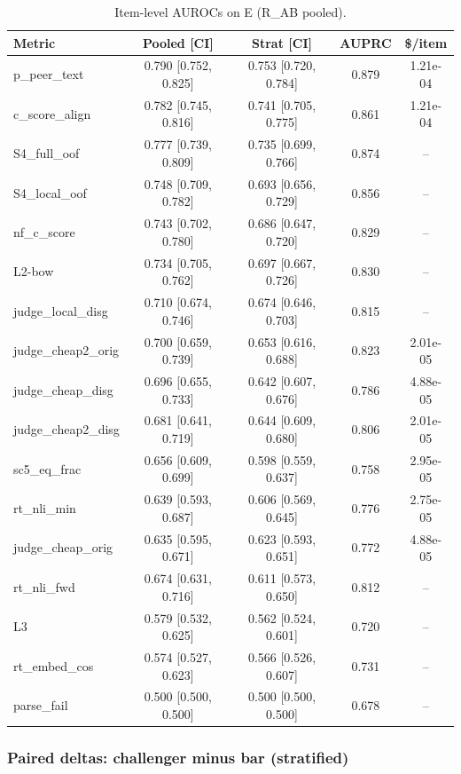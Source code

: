 \documentclass[11pt,letterpaper]{article}
\begin{document}
\begin{table}[!htbp]
\centering
\caption{Item-level AUROCs on E (R\_AB pooled).}
\label{tab:t1_itemlevel}
\small
\begin{tabular}{lcccc}
\toprule
Metric & Pooled [CI] & Strat [CI] & AUPRC & \$/item \\
\midrule
p\_peer\_text & 0.790 [0.752, 0.825] & 0.753 [0.720, 0.784] & 0.879 & 1.21e-04 \\
c\_score\_align & 0.782 [0.745, 0.816] & 0.741 [0.705, 0.775] & 0.861 & 1.21e-04 \\
S4\_full\_oof & 0.777 [0.739, 0.809] & 0.735 [0.699, 0.766] & 0.874 & -- \\
S4\_local\_oof & 0.748 [0.709, 0.782] & 0.693 [0.656, 0.729] & 0.856 & -- \\
nf\_c\_score & 0.743 [0.702, 0.780] & 0.686 [0.647, 0.720] & 0.829 & -- \\
L2-bow & 0.734 [0.705, 0.762] & 0.697 [0.667, 0.726] & 0.830 & -- \\
judge\_local\_disg & 0.710 [0.674, 0.746] & 0.674 [0.646, 0.703] & 0.815 & -- \\
judge\_cheap2\_orig & 0.700 [0.659, 0.739] & 0.653 [0.616, 0.688] & 0.823 & 2.01e-05 \\
judge\_cheap\_disg & 0.696 [0.655, 0.733] & 0.642 [0.607, 0.676] & 0.786 & 4.88e-05 \\
judge\_cheap2\_disg & 0.681 [0.641, 0.719] & 0.644 [0.609, 0.680] & 0.806 & 2.01e-05 \\
sc5\_eq\_frac & 0.656 [0.609, 0.699] & 0.598 [0.559, 0.637] & 0.758 & 2.95e-05 \\
rt\_nli\_min & 0.639 [0.593, 0.687] & 0.606 [0.569, 0.645] & 0.776 & 2.75e-05 \\
judge\_cheap\_orig & 0.635 [0.595, 0.671] & 0.623 [0.593, 0.651] & 0.772 & 4.88e-05 \\
rt\_nli\_fwd & 0.674 [0.631, 0.716] & 0.611 [0.573, 0.650] & 0.812 & -- \\
L3 & 0.579 [0.532, 0.625] & 0.562 [0.524, 0.601] & 0.720 & -- \\
rt\_embed\_cos & 0.574 [0.527, 0.623] & 0.566 [0.526, 0.607] & 0.731 & -- \\
parse\_fail & 0.500 [0.500, 0.500] & 0.500 [0.500, 0.500] & 0.678 & -- \\
\bottomrule
\end{tabular}
\end{table}

\subsubsection{Paired deltas: challenger minus bar (stratified)}
\end{document}
